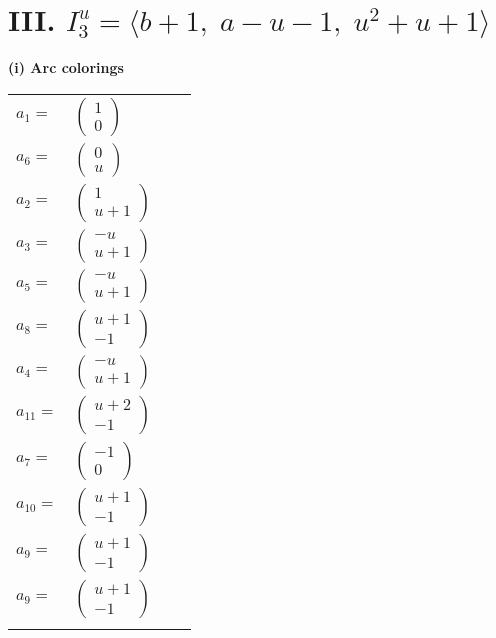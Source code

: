 \documentclass[1p]{elsarticle_modified}
\theoremstyle{definition}
\begin{document}
\centering \section*{III. $I^u_{3}= \langle b+1,\;a- u-1,\;u^2+u+1 \rangle$}
\flushleft \textbf{(i) Arc colorings}\\
\begin{tabular}{m{7pt} m{180pt} m{7pt} m{180pt} }
\flushright $a_{1}=$&$\begin{pmatrix}1\\0\end{pmatrix}$ \\
\flushright $a_{6}=$&$\begin{pmatrix}0\\u\end{pmatrix}$ \\
\flushright $a_{2}=$&$\begin{pmatrix}1\\u+1\end{pmatrix}$ \\
\flushright $a_{3}=$&$\begin{pmatrix}- u\\u+1\end{pmatrix}$ \\
\flushright $a_{5}=$&$\begin{pmatrix}- u\\u+1\end{pmatrix}$ \\
\flushright $a_{8}=$&$\begin{pmatrix}u+1\\-1\end{pmatrix}$ \\
\flushright $a_{4}=$&$\begin{pmatrix}- u\\u+1\end{pmatrix}$ \\
\flushright $a_{11}=$&$\begin{pmatrix}u+2\\-1\end{pmatrix}$ \\
\flushright $a_{7}=$&$\begin{pmatrix}-1\\0\end{pmatrix}$ \\
\flushright $a_{10}=$&$\begin{pmatrix}u+1\\-1\end{pmatrix}$ \\
\flushright $a_{9}=$&$\begin{pmatrix}u+1\\-1\end{pmatrix}$\\ \flushright $a_{9}=$&$\begin{pmatrix}u+1\\-1\end{pmatrix}$\\&\end{tabular}
\end{document}
